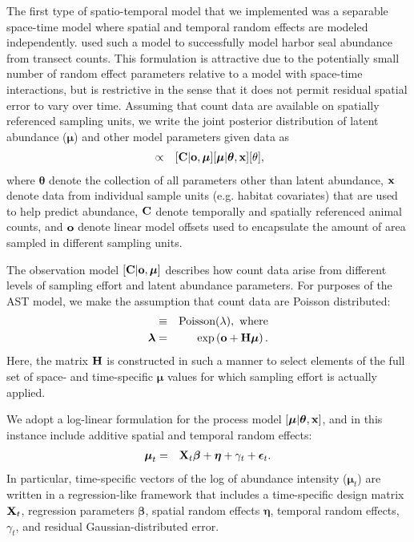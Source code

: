 \documentclass[12pt,fleqn]{article}
\begin{document}
\begin{flushleft}
The first type of spatio-temporal model that we implemented was a separable space-time model where spatial and temporal random effects are modeled independently.  \citet{VerHoefJansen2007} used such a model to successfully model harbor seal abundance from transect counts.  This formulation is attractive due to the potentially small number of random effect parameters relative to a model with space-time interactions, but is restrictive in the sense that it does not permit residual spatial error to vary over time.  Assuming that count data are available on spatially referenced sampling units, we write the joint posterior distribution of latent abundance ($\boldsymbol{\mu}$) and other model parameters given data as
\begin{eqnarray}
  [\boldsymbol{\mu},\boldsymbol{\theta} | {\bf x},{\bf C},{\bf o}] & \propto & [{\bf C} | {\bf o}, \boldsymbol{\mu}] [\boldsymbol{\mu} | \boldsymbol{\theta},{\bf x}] [\theta],
  \label{eq:hmod}
\end{eqnarray}
where $\boldsymbol{\theta}$ denote the collection of all parameters other than latent abundance, ${\bf x}$ denote data from individual sample units (e.g. habitat covariates) that are used to help predict abundance, ${\bf C}$ denote temporally and spatially referenced animal counts, and ${\bf o}$ denote linear model offsets used to encapsulate the amount of area sampled in different sampling units.

\hspace{.5in} The observation model $[{\bf C} | {\bf o}, \boldsymbol{\mu}]$ describes how count data arise from different levels of sampling effort and latent abundance parameters.  For purposes of the AST model, we make the assumption that count data are Poisson distributed:
\begin{eqnarray}
  [{\bf C} | {\bf o}, \boldsymbol{\mu}] & \equiv & \textrm{Poisson}({\bf \lambda}), \textrm{ where} \nonumber \\
  \boldsymbol{\lambda} & = & \exp \left( {\bf o} + {\bf H}\boldsymbol{\mu} \right).
  \label{eq:cmod}
\end{eqnarray}
Here, the matrix ${\bf H}$ is constructed in such a manner to select elements of the full set of space- and time-specific $\boldsymbol{\mu}$ values for which sampling effort is actually applied.

\hspace{.5in} We adopt a log-linear formulation for the process model  $[\boldsymbol{\mu} | \boldsymbol{\theta},{\bf x}]$, and in this instance include additive spatial and temporal random effects:
\begin{eqnarray*}
  \boldsymbol{\mu}_t & = & {\bf X}_{t} \boldsymbol{\beta} + \boldsymbol{\eta} + \gamma_t + \boldsymbol{\epsilon}_t.
\end{eqnarray*}
In particular, time-specific vectors of the log of abundance intensity ($\boldsymbol{\mu}_t$) are written in a regression-like framework that includes a time-specific design matrix ${\bf X}_t$, regression parameters $\boldsymbol{\beta}$, spatial random effects $\boldsymbol{\eta}$, temporal random effects, $\gamma_t$, and residual Gaussian-distributed error.


\end{flushleft}
\end{document}
